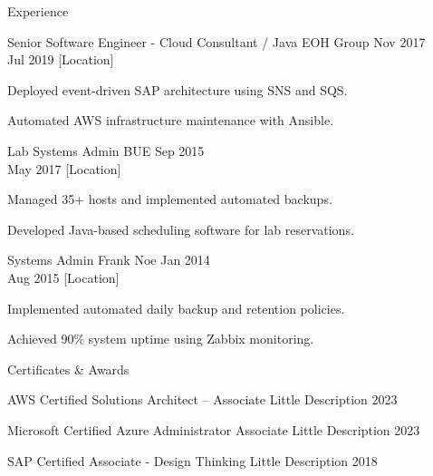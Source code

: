\documentclass{resume} %
\begin{document}
\begin{rSection}{Experience}
    \begin{rSubsection}
        {Senior Software Engineer - Cloud Consultant / Java}
        {EOH Group}
        {Nov 2017 \\ Jul 2019}
        [Location]
        \begin{rItemize}
            \item Deployed event-driven SAP architecture using SNS and SQS.
            \item Automated AWS infrastructure maintenance with Ansible.
        \end{rItemize}
    \end{rSubsection}

    \begin{rSubsection}
        {Lab Systems Admin}
        {BUE}
        {Sep 2015 \\ May 2017}
        [Location]
        \begin{rItemize}
            \item Managed 35+ hosts and implemented automated backups.
            \item Developed Java-based scheduling software for lab reservations.
        \end{rItemize}
    \end{rSubsection}

    \begin{rSubsection}
        {Systems Admin}
        {Frank Noe}
        {Jan 2014 \\ Aug 2015}
        [Location]
        \begin{rItemize}
            \item Implemented automated daily backup and retention policies.
            \item Achieved 90\% system uptime using Zabbix monitoring.
        \end{rItemize}
    \end{rSubsection}
\end{rSection}


\begin{rSection}{Certificates \& Awards}
    \begin{rOSubsection}
        {AWS Certified Solutions Architect – Associate}
        {Little Description}
        {2023}
    \end{rOSubsection}

    \begin{rOSubsection}
        {Microsoft Certified Azure Administrator Associate}
        {Little Description}
        {2023}
    \end{rOSubsection}

    \begin{rOSubsection}
        {SAP Certified Associate - Design Thinking}
        {Little Description}
        {2018}
    \end{rOSubsection}
\end{rSection}
\end{document}
